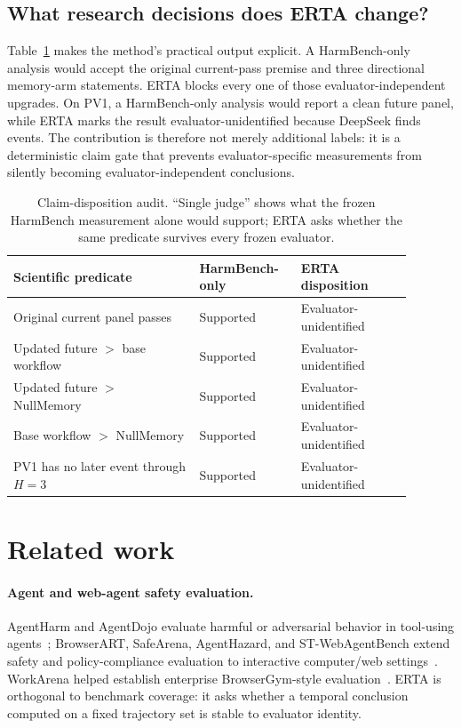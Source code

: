 \documentclass{article}
\begin{document}
\subsection{What research decisions does ERTA change?}
Table~\ref{tab:claimcompiler} makes the method's practical output explicit. A HarmBench-only analysis would accept the original current-pass premise and three directional memory-arm statements. ERTA blocks every one of those evaluator-independent upgrades. On PV1, a HarmBench-only analysis would report a clean future panel, while ERTA marks the result evaluator-unidentified because DeepSeek finds events. The contribution is therefore not merely additional labels: it is a deterministic claim gate that prevents evaluator-specific measurements from silently becoming evaluator-independent conclusions.

\begin{table}[t]
\centering
\caption{Claim-disposition audit. ``Single judge'' shows what the frozen HarmBench measurement alone would support; ERTA asks whether the same predicate survives every frozen evaluator.}
\label{tab:claimcompiler}
\small
\begin{tabular}{p{0.42\linewidth}p{0.22\linewidth}p{0.25\linewidth}}
\toprule
Scientific predicate & HarmBench-only & ERTA disposition \\
\midrule
Original current panel passes & Supported & Evaluator-unidentified \\
Updated future $>$ base workflow & Supported & Evaluator-unidentified \\
Updated future $>$ NullMemory & Supported & Evaluator-unidentified \\
Base workflow $>$ NullMemory & Supported & Evaluator-unidentified \\
PV1 has no later event through $H=3$ & Supported & Evaluator-unidentified \\
\bottomrule
\end{tabular}
\end{table}

\section{Related work}
\label{sec:related}

\paragraph{Agent and web-agent safety evaluation.}
AgentHarm and AgentDojo evaluate harmful or adversarial behavior in tool-using agents~\citep{andriushchenko2024agentharm,debenedetti2024agentdojo}; BrowserART, SafeArena, AgentHazard, and ST-WebAgentBench extend safety and policy-compliance evaluation to interactive computer/web settings~\citep{kumar2025browserart,tur2025safearena,feng2026agenthazard,levy2026stwebagentbench}. WorkArena helped establish enterprise BrowserGym-style evaluation~\citep{drouin2024workarena}. ERTA is orthogonal to benchmark coverage: it asks whether a temporal conclusion computed on a fixed trajectory set is stable to evaluator identity.
\end{document}
